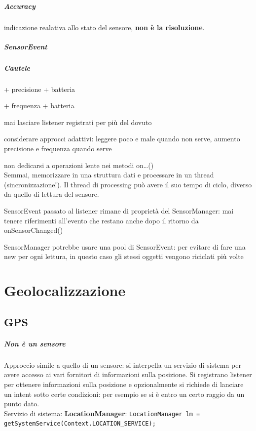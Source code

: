 \documentclass[10pt]{book}
\begin{document}
\paragraph{Accuracy} indicazione realativa allo stato del sensore, \textbf{non è la risoluzione}.
\paragraph{SensorEvent}
\paragraph{Cautele}
\begin{list}{}{}
	\item + precisione + batteria
	\item + frequenza + batteria
	\item mai lasciare listener registrati per più del dovuto
	\item considerare approcci adattivi: leggere poco e male quando non serve, aumento precisione e frequenza quando serve
	\item non dedicarsi a operazioni lente nei metodi on\ldots()\\
	Semmai, memorizzare in una struttura dati e processare in un thread (sincronizzazione!). Il thread di processing può avere il suo tempo di ciclo, diverso da quello di lettura del sensore.
	\item SensorEvent passato al listener rimane di proprietà del SensorManager: mai tenere riferimenti all'evento che restano anche dopo il ritorno da onSensorChanged()
	\item SensorManager potrebbe usare una pool di SensorEvent: per evitare di fare una new per ogni lettura, in questo caso gli stessi oggetti vengono riciclati più volte
\end{list}
\chapter{Geolocalizzazione}
\section{GPS}
\paragraph{Non è un sensore} Approccio simile a quello di un sensore: si interpella un servizio di sistema per avere accesso ai vari fornitori di informazioni sulla posizione. Si registrano listener per ottenere informazioni sulla posizione e opzionalmente si richiede di lanciare un intent sotto certe condizioni: per esempio se si è entro un certo raggio da un punto dato.\\
Servizio di sistema: \textbf{LocationManager}: \texttt{LocationManager lm = getSystemService(Context.LOCATION\_SERVICE);}
\end{document}

